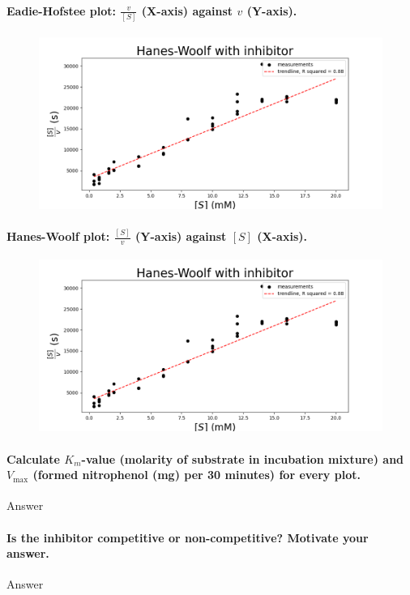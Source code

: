 \documentclass[a4paper,12pt]{article}
\begin{document}
\paragraph{Eadie-Hofstee plot: $\frac{v}{[S]}$ (X-axis) against $v$ (Y-axis).}

\begin{figure}[!ht]
    \includegraphics[scale=0.5]{fig3_4.png}
    \centering
\end{figure}

\paragraph{Hanes-Woolf plot: $\frac{[S]}{v}$ (Y-axis) against $[S]$ (X-axis).}

\begin{figure}[!ht]
    \includegraphics[scale=0.5]{fig3_4.png}
    \centering
\end{figure}

\paragraph{Calculate $K_m$-value (molarity of substrate in incubation mixture) and $V_{\text{max}}$ (formed nitrophenol (mg) per 30 minutes) for every plot.}
 
 Answer\\

\paragraph{Is the inhibitor competitive or non-competitive? Motivate your answer.}

Answer\\
\end{document}
